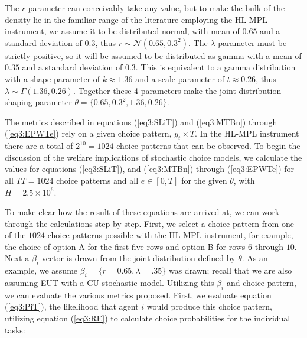 \documentclass[../main.tex]{subfiles}
\begin{document}
The $r$ parameter can conceivably take any value, but to make the bulk of the density lie in the familiar range of the literature employing the HL-MPL instrument, we assume it to be distributed normal, with mean of $0.65$ and a standard deviation of $0.3$, thus $r \sim \mathcal{N}(0.65 , 0.3^2 )$.
The $\lambda$ parameter must be strictly positive, so it will be assumed to be distributed as gamma with a mean of $0.35$ and a standard deviation of $0.3$.
This is equivalent to a gamma distribution with a shape parameter of $k \approx 1.36$ and a scale parameter of $t\approx0.26$, thus $\lambda \sim \Gamma(1.36 , 0.26)$.
Together these 4 parameters make the joint distribution-shaping parameter $\theta=\{0.65 ,0.3^2, 1.36 , 0.26\}$.

The metrics described in equations (\ref{eq3:SLiT}) and (\ref{eq3:MTBn}) through (\ref{eq3:EPWTe}) rely on a given choice pattern, $y_t \times T$.
In the HL-MPL instrument there are a total of $2^{10}=1024$ choice patterns that can be observed.
To begin the discussion of the welfare implications of stochastic choice models, we calculate the values for equations (\ref{eq3:SLiT}), and (\ref{eq3:MTBn}) through (\ref{eq3:EPWTe}) for all $\mathit{TT} =1024$ choice patterns and all $e \in[0,T]$ for the given $\theta$, with $H=2.5 \times 10^6$.


To make clear how the result of these equations are arrived at, we can work through the calculations step by step.
First, we select a choice pattern from one of the $1024$ choice patterns possible with the HL-MPL instrument, for example, the choice of option A for the first five rows and option B for rows $6$ through $10$.
Next a $\beta_i$ vector is drawn from the joint distribution defined by $\theta$.
As an example, we assume $\beta_i = \lbrace r = 0.65, \lambda = .35\rbrace$ was drawn; recall that we are also assuming EUT with a CU stochastic model.
Utilizing this $\beta_i$ and choice pattern, we can evaluate the various metrics proposed.
First, we evaluate equation (\ref{eq3:PiT}), the likelihood that agent $i$ would produce this choice pattern, utilizing equation (\ref{eq3:RE}) to calculate choice probabilities for the individual tasks:
\end{document}
